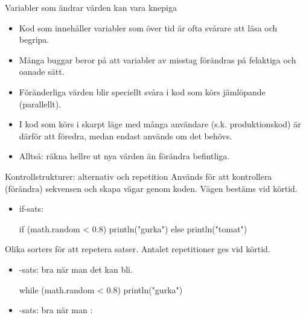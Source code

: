 \begin{Slide}{Variabler som ändrar värden kan vara knepiga}
\begin{itemize}
\item Kod som innehåller variabler som  över tid är ofta svårare att läsa och begripa.

\item Många buggar beror på att variabler av misstag förändras på felaktiga och oanade sätt.

\item Föränderliga värden blir speciellt svåra i kod som körs jämlöpande (parallellt).

\item I kod som körs i skarpt läge med många användare (s.k. produktionskod) är därför  att föredra, medan  endast används om det  behövs.
\item Alltså: räkna hellre ut nya värden än förändra befintliga.
\end{itemize}
\end{Slide}



\begin{Slide}{Kontrollstrukturer: alternativ och repetition}\SlideFontSmall
Används för att kontrollera (förändra) sekvensen och skapa  vägar genom koden. Vägen  bestäms vid körtid.
\begin{itemize}
\item if-sats:
\begin{Code}
if (math.random < 0.8) println("gurka") else println("tomat")
\end{Code}
\end{itemize}

Olika sorters  för att repetera satser. Antalet repetitioner ges vid körtid.
\begin{itemize}
\item {}-sats: bra när man  det kan bli.
\begin{Code}
while (math.random < 0.8) println("gurka")
\end{Code}

\item {}-sats: bra när man :

\end{itemize}
\end{Slide}

